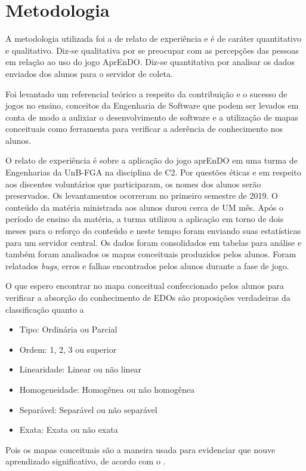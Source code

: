 \chapter[Metodologia]{Metodologia}
A metodologia utilizada foi a de relato de experiência e é de caráter quantitativo e qualitativo. Diz-se qualitativa por se preocupar com as percepções das pessoas em relação ao uso do jogo AprEnDO. Diz-se quantitativa por analisar os dados enviados dos alunos para o servidor de coleta. 

Foi levantado um referencial teórico a respeito da contribuição e o sucesso de jogos no ensino, conceitos da Engenharia de Software que podem ser levados em conta de modo a aulixiar o desenvolvimento de software e a utilização de mapas conceituais como ferramenta para verificar a aderência de conhecimento nos alunos.

O relato de experiência é sobre a aplicação do jogo aprEnDO em uma turma de Engenharias da UnB-FGA na disciplina de C2. Por questões éticas e em respeito aos discentes voluntários que participaram, os nomes dos alunos serão preservados. Os levantamentos ocorreram no primeiro semestre de 2019. O conteúdo da matéria ministrada aos alunos durou cerca de UM mês. Após o período de ensino da matéria, a turma utilizou a aplicação em torno de dois meses para o reforço do conteúdo e neste tempo foram enviando suas estatísticas para um servidor central. Os dados foram consolidados em tabelas para análise e também foram analisados os mapas conceituais produzidos pelos alunos. Foram relatados \textit{bugs}, erros e falhas encontrados pelos alunos durante a fase de jogo. 

O que espero encontrar no mapa conceitual confeccionado pelos alunos para verificar a absorção do conhecimento de EDOs são proposições verdadeiras da classificação quanto a 
\begin{itemize}
\item Tipo: Ordinária ou Parcial
\item Ordem: 1, 2, 3 ou superior
\item Linearidade: Linear ou não linear 
\item Homogeneidade: Homogênea ou não homogênea
\item Separável: Separável ou não separável
\item Exata: Exata ou não exata
\end{itemize}

Pois os mapas conceituais são a maneira usada para evidenciar que nouve aprendizado significativo, de acordo com o \cite{ausubel}.

